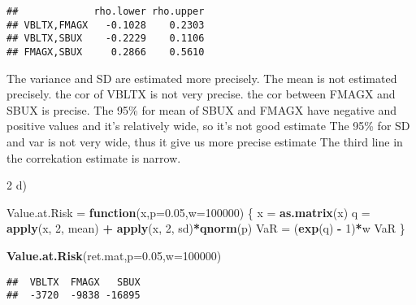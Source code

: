 \documentclass[]{article}
\newenvironment{Shaded}{\begin{snugshade}}{\end{snugshade}}
\newcommand{\KeywordTok}[1]{\textcolor[rgb]{0.13,0.29,0.53}{\textbf{#1}}}
\newcommand{\DataTypeTok}[1]{\textcolor[rgb]{0.13,0.29,0.53}{#1}}
\newcommand{\DecValTok}[1]{\textcolor[rgb]{0.00,0.00,0.81}{#1}}
\newcommand{\FloatTok}[1]{\textcolor[rgb]{0.00,0.00,0.81}{#1}}
\newcommand{\StringTok}[1]{\textcolor[rgb]{0.31,0.60,0.02}{#1}}
\newcommand{\CommentTok}[1]{\textcolor[rgb]{0.56,0.35,0.01}{\textit{#1}}}
\newcommand{\ControlFlowTok}[1]{\textcolor[rgb]{0.13,0.29,0.53}{\textbf{#1}}}
\newcommand{\OperatorTok}[1]{\textcolor[rgb]{0.81,0.36,0.00}{\textbf{#1}}}
\newcommand{\NormalTok}[1]{#1}
\begin{document}
\begin{Shaded}
\end{Shaded}

\begin{verbatim}
##             rho.lower rho.upper
## VBLTX,FMAGX   -0.1028    0.2303
## VBLTX,SBUX    -0.2229    0.1106
## FMAGX,SBUX     0.2866    0.5610
\end{verbatim}

The variance and SD are estimated more precisely. The mean is not
estimated precisely. the cor of VBLTX is not very precise. the cor
between FMAGX and SBUX is precise. The 95\% for mean of SBUX and FMAGX
have negative and positive values and it's relatively wide, so it's not
good estimate The 95\% for SD and var is not very wide, thus it give us
more precise estimate The third line in the correkation estimate is
narrow.

2 d)

\begin{Shaded}
\begin{Highlighting}[]
\NormalTok{Value.at.Risk =}\StringTok{ }\ControlFlowTok{function}\NormalTok{(x,}\DataTypeTok{p=}\FloatTok{0.05}\NormalTok{,}\DataTypeTok{w=}\DecValTok{100000}\NormalTok{) \{}
\NormalTok{    x =}\StringTok{ }\KeywordTok{as.matrix}\NormalTok{(x)}
\NormalTok{    q =}\StringTok{ }\KeywordTok{apply}\NormalTok{(x, }\DecValTok{2}\NormalTok{, mean) }\OperatorTok{+}\StringTok{ }\KeywordTok{apply}\NormalTok{(x, }\DecValTok{2}\NormalTok{, sd)}\OperatorTok{*}\KeywordTok{qnorm}\NormalTok{(p)}
\NormalTok{    VaR =}\StringTok{ }\NormalTok{(}\KeywordTok{exp}\NormalTok{(q) }\OperatorTok{-}\StringTok{ }\DecValTok{1}\NormalTok{)}\OperatorTok{*}\NormalTok{w}
\NormalTok{    VaR}
\NormalTok{\}}

\KeywordTok{Value.at.Risk}\NormalTok{(ret.mat,}\DataTypeTok{p=}\FloatTok{0.05}\NormalTok{,}\DataTypeTok{w=}\DecValTok{100000}\NormalTok{)}
\end{Highlighting}
\end{Shaded}

\begin{verbatim}
##  VBLTX  FMAGX   SBUX 
##  -3720  -9838 -16895
\end{verbatim}
\end{document}
